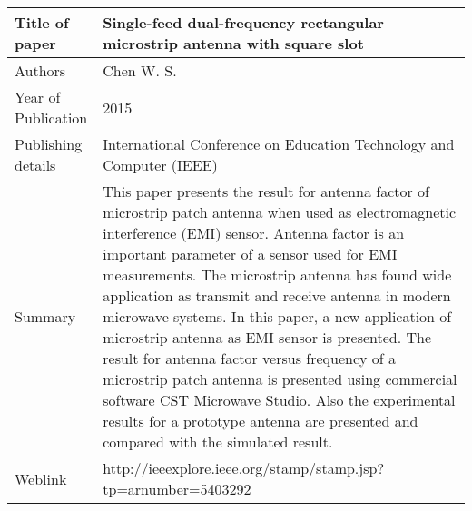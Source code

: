 \documentclass{article}
\begin{document}
\begin{table}
  \centering
	\begin{tabular}{ |l|p{11cm}| }
			\hline
		     Title of paper &  Single-feed dual-frequency rectangular microstrip antenna with square slot \\
		     \hline
			 Authors & Chen W. S. \\
			\hline
			 Year of Publication & 2015 \\
			\hline
			 Publishing details & International Conference on Education Technology and Computer (IEEE) \\ \hline
			 Summary & This paper presents the result for antenna factor of microstrip patch antenna when used as electromagnetic interference (EMI) sensor. Antenna factor is an important parameter of a sensor used for EMI measurements. The microstrip antenna has found wide application as transmit and receive antenna in modern microwave systems. In this paper, a new application of microstrip antenna as EMI sensor is presented. The result for antenna factor versus frequency of a microstrip patch antenna is presented using commercial software CST Microwave Studio. Also the experimental results for a prototype antenna are presented and compared with the simulated result.\\
			\hline
			 Weblink & http://ieeexplore.ieee.org/stamp/stamp.jsp?tp=arnumber=5403292 \\
			 \hline			 
	\end{tabular}		

\end{table}
\end{document}
